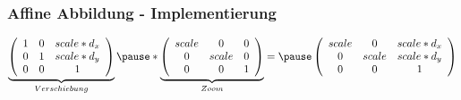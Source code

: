 \begin{frame}
\frametitle{Affine Abbildung - Implementierung}
\pause
\scriptsize$\underbrace {\left(
   \begin{array}{ccc}
     1 & 0 & scale*d_{x} \\
     0 & 1 & scale*d_{y} \\
     0 & 0 & 1
   \end{array}
\right)}_{Verschiebung}\pause*\underbrace {\left(
   \begin{array}{ccc}
     scale & 0 & 0 \\
     0 & scale & 0 \\
     0 & 0 & 1
   \end{array}
\right)}_{Zoom}=\pause\left(
   \begin{array}{ccc}
     scale & 0 & scale*d_{x} \\
     0 & scale & scale*d_{y} \\
     0 & 0 & 1
   \end{array}
\right)$
\vspace{\baselineskip}
\vspace{\baselineskip}
\pause
\lstset{frame=single}

\end{frame}